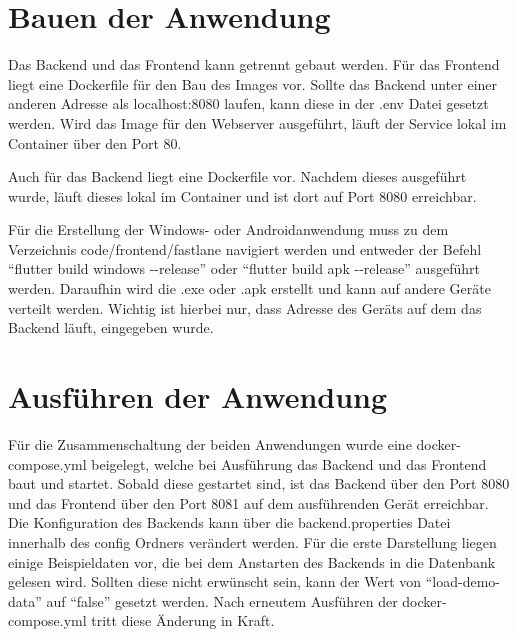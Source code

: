 \section{Bauen der Anwendung}
\label{sec:bauen}

Das Backend und das Frontend kann getrennt gebaut werden.
Für das Frontend liegt eine Dockerfile für den Bau des Images vor.
Sollte das Backend unter einer anderen Adresse als localhost:8080 laufen, kann diese in der .env Datei
gesetzt werden.
Wird das Image für den Webserver ausgeführt, läuft der Service lokal im Container über den Port 80. \medskip

Auch für das Backend liegt eine Dockerfile vor.
Nachdem dieses ausgeführt wurde, läuft dieses lokal im Container und ist dort auf Port 8080 erreichbar. \medskip

Für die Erstellung der Windows- oder Androidanwendung muss zu dem Verzeichnis code/frontend/fastlane navigiert werden
und entweder der Befehl \enquote{flutter build windows -{-}release} oder \enquote{flutter build apk -{-}release} ausgeführt werden.
Daraufhin wird die .exe oder .apk erstellt und kann auf andere Geräte verteilt werden.
Wichtig ist hierbei nur, dass Adresse des Geräts auf dem das Backend läuft, eingegeben wurde.

\section{Ausführen der Anwendung}
\label{sec:ausfuehren}

Für die Zusammenschaltung der beiden Anwendungen wurde eine docker-compose.yml beigelegt,
welche bei Ausführung das Backend und das Frontend baut und startet.
Sobald diese gestartet sind, ist das Backend über den Port 8080 und das Frontend über den Port 8081 auf dem ausführenden
Gerät erreichbar.
Die Konfiguration des Backends kann über die backend.properties Datei innerhalb des config Ordners verändert werden.
Für die erste Darstellung liegen einige Beispieldaten vor, die bei dem Anstarten des Backends in die Datenbank
gelesen wird.
Sollten diese nicht erwünscht sein, kann der Wert von \enquote{load-demo-data} auf \enquote{false} gesetzt werden.
Nach erneutem Ausführen der docker-compose.yml tritt diese Änderung in Kraft.
